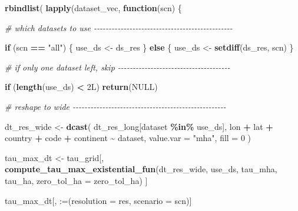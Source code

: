 \documentclass[
  11pt,
]{article}
\newenvironment{Shaded}{\begin{snugshade}}{\end{snugshade}}
\newcommand{\AttributeTok}[1]{\textcolor[rgb]{0.13,0.29,0.53}{#1}}
\newcommand{\CommentTok}[1]{\textcolor[rgb]{0.56,0.35,0.01}{\textit{#1}}}
\newcommand{\ConstantTok}[1]{\textcolor[rgb]{0.56,0.35,0.01}{#1}}
\newcommand{\ControlFlowTok}[1]{\textcolor[rgb]{0.13,0.29,0.53}{\textbf{#1}}}
\newcommand{\DataTypeTok}[1]{\textcolor[rgb]{0.13,0.29,0.53}{#1}}
\newcommand{\DecValTok}[1]{\textcolor[rgb]{0.00,0.00,0.81}{#1}}
\newcommand{\FunctionTok}[1]{\textcolor[rgb]{0.13,0.29,0.53}{\textbf{#1}}}
\newcommand{\NormalTok}[1]{#1}
\newcommand{\OtherTok}[1]{\textcolor[rgb]{0.56,0.35,0.01}{#1}}
\newcommand{\SpecialCharTok}[1]{\textcolor[rgb]{0.81,0.36,0.00}{\textbf{#1}}}
\newcommand{\StringTok}[1]{\textcolor[rgb]{0.31,0.60,0.02}{#1}}
\begin{document}
\begin{Shaded}
\begin{Highlighting}[]
    \FunctionTok{rbindlist}\NormalTok{(}
      \FunctionTok{lapply}\NormalTok{(dataset\_vec, }\ControlFlowTok{function}\NormalTok{(scn) \{}

        \CommentTok{\# which datasets to use {-}{-}{-}{-}{-}{-}{-}{-}{-}{-}{-}{-}{-}{-}{-}{-}{-}{-}{-}{-}{-}{-}{-}{-}{-}{-}{-}{-}{-}{-}{-}{-}{-}{-}{-}{-}{-}{-}{-}{-}{-}{-}{-}{-}{-}{-}{-}}
        
        \ControlFlowTok{if}\NormalTok{ (scn }\SpecialCharTok{==} \StringTok{"all"}\NormalTok{) \{}
\NormalTok{          use\_ds }\OtherTok{\textless{}{-}}\NormalTok{ ds\_res}
\NormalTok{        \} }\ControlFlowTok{else}\NormalTok{ \{}
\NormalTok{          use\_ds }\OtherTok{\textless{}{-}} \FunctionTok{setdiff}\NormalTok{(ds\_res, scn)}
\NormalTok{        \}}

        \CommentTok{\# if only one dataset left, skip {-}{-}{-}{-}{-}{-}{-}{-}{-}{-}{-}{-}{-}{-}{-}{-}{-}{-}{-}{-}{-}{-}{-}{-}{-}{-}{-}{-}{-}{-}{-}{-}{-}{-}{-}{-}{-}{-}}
        
        \ControlFlowTok{if}\NormalTok{ (}\FunctionTok{length}\NormalTok{(use\_ds) }\SpecialCharTok{\textless{}} \DecValTok{2}\DataTypeTok{L}\NormalTok{) }\FunctionTok{return}\NormalTok{(}\ConstantTok{NULL}\NormalTok{)}

        \CommentTok{\# reshape to wide {-}{-}{-}{-}{-}{-}{-}{-}{-}{-}{-}{-}{-}{-}{-}{-}{-}{-}{-}{-}{-}{-}{-}{-}{-}{-}{-}{-}{-}{-}{-}{-}{-}{-}{-}{-}{-}{-}{-}{-}{-}{-}{-}{-}{-}{-}{-}{-}{-}{-}{-}{-}}
        
        
\NormalTok{        dt\_res\_wide }\OtherTok{\textless{}{-}} \FunctionTok{dcast}\NormalTok{(}
\NormalTok{          dt\_res\_long[dataset }\SpecialCharTok{\%in\%}\NormalTok{ use\_ds],}
\NormalTok{          lon }\SpecialCharTok{+}\NormalTok{ lat }\SpecialCharTok{+}\NormalTok{ country }\SpecialCharTok{+}\NormalTok{ code }\SpecialCharTok{+}\NormalTok{ continent }\SpecialCharTok{\textasciitilde{}}\NormalTok{ dataset,}
          \AttributeTok{value.var =} \StringTok{"mha"}\NormalTok{, }\AttributeTok{fill =} \DecValTok{0}
\NormalTok{        )}

\NormalTok{        tau\_max\_dt }\OtherTok{\textless{}{-}}\NormalTok{ tau\_grid[,}
          \FunctionTok{compute\_tau\_max\_existential\_fun}\NormalTok{(dt\_res\_wide, use\_ds, tau\_mha, tau\_ha,}
                                          \AttributeTok{zero\_tol\_ha =}\NormalTok{ zero\_tol\_ha)}
\NormalTok{        ]}

\NormalTok{        tau\_max\_dt[, }\StringTok{\textasciigrave{}}\AttributeTok{:=}\StringTok{\textasciigrave{}}\NormalTok{(}\AttributeTok{resolution =}\NormalTok{ res, }\AttributeTok{scenario =}\NormalTok{ scn)]}


\end{Highlighting}
\end{Shaded}
\end{document}
